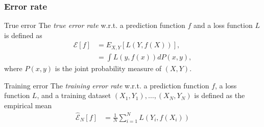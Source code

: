 \documentclass[compress, smaller, serif, 9pt]{beamer}
\begin{document}
\begin{frame}
  \frametitle{Error rate}
  \begin{block}{True error}
   The {\it true error rate} w.r.t. a prediction function $f$
   and a loss function $L$ is defined as
   \begin{align*}
    \mathcal{E}[f]&= E_{X,Y} \left[ L\left(Y,f(X) \right) \right],\\
    &= \int  L\left(y,f(x) \right) dP(x,y),
   \end{align*}
  where $P(x,y)$ is the joint probability measure of $(X,Y)$.
  \end{block}
  \begin{block}{Training error}
   The {\it training error rate} w.r.t. a prediction function $f$, 
   a loss function $L$, and a training dataset  $(X_1,Y_1), \ldots,(X_N,Y_N)$
   is defined as the empirical mean
   \begin{align*}
    \hat{\mathcal{E}}_N[f]&= \frac{1}{N} \sum_{i=1}^N  L\left(Y_i,f(X_i) \right)
   \end{align*}
  \end{block}
\end{frame}
\end{document}
